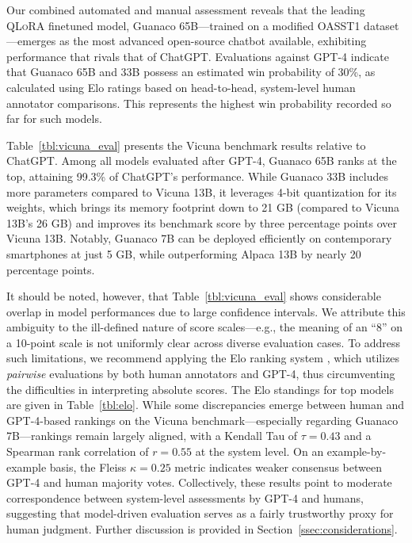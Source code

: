 Our combined automated and manual assessment reveals that the leading \textsc{QLoRA} finetuned model, {Guanaco} 65B—trained on a modified OASST1 dataset—emerges as the most advanced open-source chatbot available, exhibiting performance that rivals that of ChatGPT. Evaluations against GPT-4 indicate that {Guanaco} 65B and 33B possess an estimated win probability of 30\%, as calculated using Elo ratings based on head-to-head, system-level human annotator comparisons. This represents the highest win probability recorded so far for such models.

Table~\ref{tbl:vicuna_eval} presents the Vicuna benchmark \cite{vicuna2023} results relative to ChatGPT. Among all models evaluated after GPT-4, {Guanaco} 65B ranks at the top, attaining 99.3\% of ChatGPT’s performance. While {Guanaco} 33B includes more parameters compared to Vicuna 13B, it leverages 4-bit quantization for its weights, which brings its memory footprint down to 21 GB (compared to Vicuna 13B's 26 GB) and improves its benchmark score by three percentage points over Vicuna 13B. Notably, {Guanaco} 7B can be deployed efficiently on contemporary smartphones at just 5 GB, while outperforming Alpaca 13B by nearly 20 percentage points.

It should be noted, however, that Table~\ref{tbl:vicuna_eval} shows considerable overlap in model performances due to large confidence intervals. We attribute this ambiguity to the ill-defined nature of score scales—e.g., the meaning of an “8” on a 10-point scale is not uniformly clear across diverse evaluation cases. To address such limitations, we recommend applying the Elo ranking system \citep{elo1967proposed}, which utilizes \textit{pairwise} evaluations by both human annotators and GPT-4, thus circumventing the difficulties in interpreting absolute scores. The Elo standings for top models are given in Table~\ref{tbl:elo}. While some discrepancies emerge between human and GPT-4-based rankings on the Vicuna benchmark—especially regarding Guanaco 7B—rankings remain largely aligned, with a Kendall Tau of $\tau=0.43$ and a Spearman rank correlation of $r=0.55$ at the system level. On an example-by-example basis, the Fleiss $\kappa=0.25$ metric indicates weaker consensus between GPT-4 and human majority votes. Collectively, these results point to moderate correspondence between system-level assessments by GPT-4 and humans, suggesting that model-driven evaluation serves as a fairly trustworthy proxy for human judgment. Further discussion is provided in Section~\ref{ssec:considerations}.

